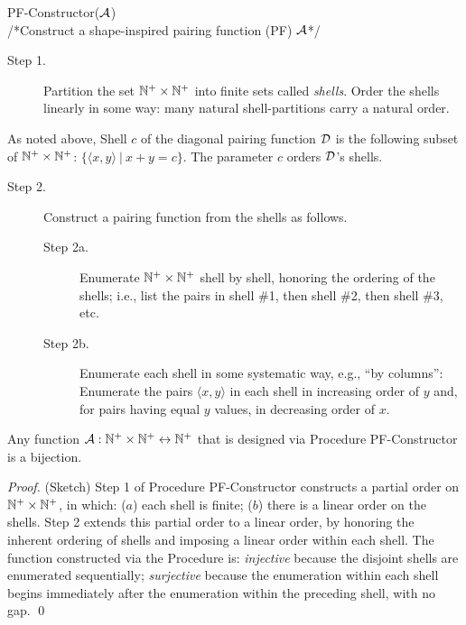  {\small\sf PF-Constructor}($\mbox{$\cal A$}$) \\
/*Construct a shape-inspired pairing function (PF) $\mbox{$\cal A$}$*/
\begin{description}
\item[Step 1.]
%
Partition the set $\mathbb{N}^+ \times \mathbb{N}^+$ into finite sets called {\it
  shells}.  Order the shells linearly in some way: many natural
shell-partitions carry a natural order.
\end{description}
As noted above, Shell $c$ of the diagonal pairing function $\mbox{$\cal D$}$ is the
following subset of $\mathbb{N}^+ \times \mathbb{N}^+$: $\{ \langle x,y \rangle \ |
\ x+y = c \}$.  The parameter $c$ orders $\mbox{$\cal D$}$'s shells.

\begin{description}
\item[Step 2.]
Construct a pairing function from the shells as follows.
  \begin{description}
  \item[Step 2a.]
Enumerate $\mathbb{N}^+ \times \mathbb{N}^+$ shell by shell, honoring the ordering of
the shells; i.e., list the pairs in shell \#1, then shell \#2, then
shell \#3, etc.
  \item[Step 2b.]
Enumerate each shell in some systematic way, e.g., ``by columns'':
Enumerate the pairs $\langle x,y \rangle$ in each shell in increasing
order of $y$ and, for pairs having equal $y$ values, in decreasing
order of $x$.
  \end{description}
\end{description}

\begin{prop}
\label{thm:PF-construct}
Any function $\mbox{$\cal A$}: \mathbb{N}^+ \times \mathbb{N}^+ \leftrightarrow \mathbb{N}^+$ that is
designed via Procedure {\small\sf PF-Constructor} is a bijection.
\end{prop}

\begin{proof}(Sketch) Step 1 of Procedure {\small\sf PF-Constructor}
constructs a partial order on $\mathbb{N}^+ \times \mathbb{N}^+$, in which: ($a$) each
shell is finite; ($b$) there is a linear order on the shells.  Step 2
extends this partial order to a linear order, by honoring the inherent
ordering of shells and imposing a linear order within each shell.  The
function constructed via the Procedure is: {\em injective} because the
disjoint shells are enumerated sequentially; {\em surjective} because
the enumeration within each shell begins immediately after the
enumeration within the preceding shell, with no gap.  \qed
\end{proof}

